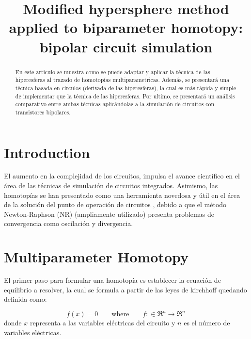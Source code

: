\documentclass[conference,letterpaper,twocolumn]{IEEEtran}
\begin{document}
\title{Modified hypersphere method applied to biparameter homotopy: bipolar circuit simulation}

\author{
}

\maketitle

\begin{abstract}
En este artículo se muestra como se puede adaptar y aplicar la técnica de las hiperesferas al trazado de homotopías
multiparametricas. Además,  se presentará una técnica basada en círculos (derivada de las hiperesferas), la cual
es más rápida y simple de implementar que la técnica de las hiperesferas.
Por ultimo, se presentará un análisis comparativo entre ambas técnicas aplicándolas a la simulación
de circuitos con transistores bipolares.
\end{abstract}
 

\section{Introduction} 

El aumento en la complejidad de los circuitos, impulsa el avance científico en el área
de las técnicas de simulación de circuitos integrados. Asimismo, las homotopías se han presentado
como una herramienta novedosa y útil en el área de la solución del punto de operación de circuitos \cite{homo_ArtificialP,homo_iscas05}, debido a que
el método Newton-Raphson (NR) (ampliamente utilizado)  presenta problemas de convergencia como oscilación
y divergencia.

\section{Multiparameter Homotopy}

El primer paso para formular una homotopía es establecer la ecuación de equilibrio a resolver,
la cual se formula a partir de las leyes de kirchhoff quedando definida como:

\begin{equation}
{f}({x})={0} \qquad \text{where} \qquad f:\in \mathfrak{R}^n \to  \mathfrak{R}^n 
\label{fx}
\end{equation}
donde $x$ representa a las variables eléctricas del circuito y $n$ es el número de variables eléctricas.
\end{document}
